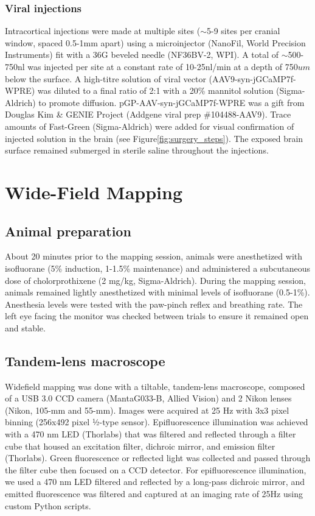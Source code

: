 \subsubsection{Viral injections}
Intracortical injections were made at multiple sites ($\sim$5-9 sites per cranial window, spaced 0.5-1mm apart) using a microinjector (NanoFil, World Precision Instruments) fit with a 36G beveled needle (NF36BV-2, WPI). A total of $\sim$500-750nl was injected per site at a constant rate of 10-25nl/min at a depth of 750$um$ below the surface. A high-titre solution of viral vector (AAV9-syn-jGCaMP7f-WPRE) was diluted to a final ratio of 2:1 with a 20\% mannitol solution (Sigma-Aldrich) to promote diffusion. pGP-AAV-syn-jGCaMP7f-WPRE was a gift from Douglas Kim \& GENIE Project (Addgene viral prep \#104488-AAV9). Trace amounts of Fast-Green (Sigma-Aldrich) were added for visual confirmation of injected solution in the brain (see Figure\ref{fig:surgery_steps}). The exposed brain surface remained submerged in sterile saline throughout the injections.

\section{Wide-Field Mapping}
\subsection{Animal preparation}
About 20 minutes prior to the mapping session, animals were anesthetized with isofluorane (5\% induction, 1-1.5\% maintenance) and administered a subcutaneous dose of cholorprothixene (2 mg/kg, Sigma-Aldrich). During the mapping session, animals remained lightly anesthetized with minimal levels of isofluorane (0.5-1\%). Anesthesia levels were tested with the paw-pinch reflex and breathing rate. The left eye facing the monitor was checked between trials to ensure it remained open and stable. 

\subsection{Tandem-lens macroscope}
Widefield mapping was done with a tiltable, tandem-lens macroscope\cite{Ratzlaff1991, Kalatsky2003}, composed of a USB 3.0 CCD camera (MantaG033-B, Allied Vision) and 2 Nikon lenses (Nikon, 105-mm and 55-mm). Images were acquired at 25 Hz with 3x3 pixel binning (256x492 pixel ½-type sensor). Epifluorescence illumination was achieved with a 470 nm LED (Thorlabs) that was filtered and reflected through a filter cube that housed an excitation filter, dichroic mirror, and emission filter (Thorlabs). Green fluorescence or reflected light was collected and passed through the filter cube then focused on a CCD detector. For epifluorescence illumination, we used a 470 nm LED filtered and reflected by a long-pass dichroic mirror, and emitted fluorescence was filtered and captured at an imaging rate of 25Hz using custom Python scripts.

